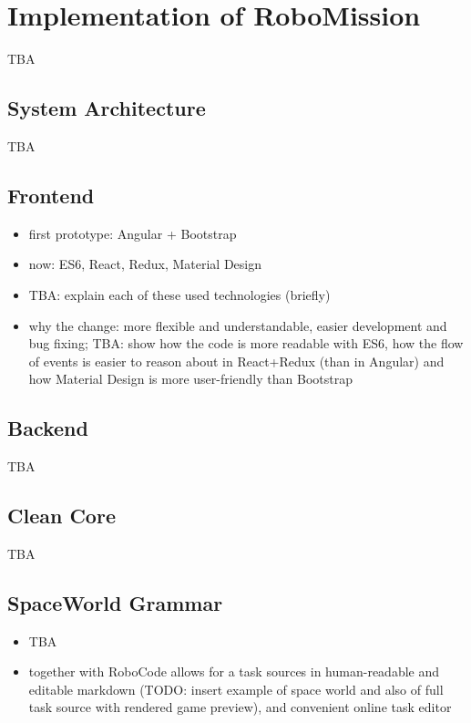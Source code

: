 \chapter{Implementation of RoboMission}
\label{chap:implementation-of-robomission}

TBA

\section{System Architecture}

TBA

\section{Frontend}

\begin{itemize}
\item first prototype: Angular + Bootstrap
\item now: ES6, React, Redux, Material Design
\item TBA: explain each of these used technologies (briefly)
\item why the change: more flexible and understandable, easier development and bug fixing; TBA: show how the code is more readable with ES6, how the flow of events is easier to reason about in React+Redux (than in Angular) and how Material Design is more user-friendly than Bootstrap
\end{itemize}

\section{Backend}

TBA

\section{Clean Core}

TBA


\section{SpaceWorld Grammar}

\begin{itemize}
\item TBA
\item together with RoboCode allows for a task sources in human-readable and editable markdown (TODO: insert example of space world and also of full task source with rendered game preview), and convenient online task editor
\end{itemize}


